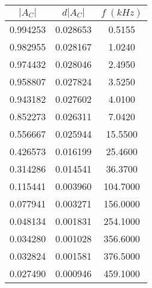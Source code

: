 \begin{tabular}{cc|c}
\toprule
$|A_{C}|$ & $d|A_{C}|$ & $f \; (kHz)$ \\
\midrule
 0.994253 &   0.028653 &       0.5155 \\
 0.982955 &   0.028167 &       1.0240 \\
 0.974432 &   0.028046 &       2.4950 \\
 0.958807 &   0.027824 &       3.5250 \\
 0.943182 &   0.027602 &       4.0100 \\
 0.852273 &   0.026311 &       7.0420 \\
 0.556667 &   0.025944 &      15.5500 \\
 0.426573 &   0.016199 &      25.4600 \\
 0.314286 &   0.014541 &      36.3700 \\
 0.115441 &   0.003960 &     104.7000 \\
 0.077941 &   0.003271 &     156.0000 \\
 0.048134 &   0.001831 &     254.1000 \\
 0.034280 &   0.001028 &     356.6000 \\
 0.032824 &   0.001581 &     376.5000 \\
 0.027490 &   0.000946 &     459.1000 \\
\bottomrule
\end{tabular}
